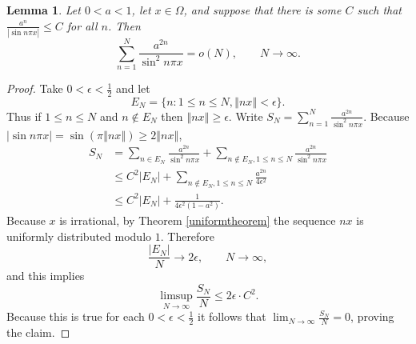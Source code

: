 \documentclass{amsart}
\newcommand{\norm}[1]{\left\Vert #1 \right\Vert}
\newtheorem{lemma}[theorem]{Lemma}
\begin{document}
\begin{lemma}
Let $0<a<1$, let $x \in \Omega$, and suppose that there is some $C$ such that
$\frac{a^n}{|\sin n\pi x|} \leq C$ for all $n$. Then
\[
\sum_{n=1}^N \frac{a^{2n}}{\sin^2 n \pi x} = o(N),\qquad N \to \infty.
\]
\label{axC}
\end{lemma}
\begin{proof}
Take $0<\epsilon<\frac{1}{2}$ and let
\[
E_N = \{n: 1 \leq n \leq N, \norm{nx}<\epsilon\}.
\]
Thus if $1 \leq n \leq N$ and $n \not \in E_N$ then $\norm{nx} \geq \epsilon$. 
Write $S_N=\sum_{n=1}^N \frac{a^{2n}}{\sin^2 n \pi x}$.
Because $|\sin n\pi x| =\sin(\pi \norm{nx}) \geq 2\norm{nx}$,
\begin{align*}
S_N&=\sum_{n \in E_N} \frac{a^{2n}}{\sin^2 n\pi x} + \sum_{n \not \in E_N, 1 \leq n \leq N} 
\frac{a^{2n}}{\sin^2 n \pi x}\\
&\leq C^2 |E_N| + \sum_{n \not \in E_N, 1 \leq n \leq N} \frac{a^{2n}}{4 \epsilon^2}\\
&\leq C^2 |E_N| + \frac{1}{4\epsilon^2(1-a^2)}. 
\end{align*}
Because $x$ is irrational, by Theorem \ref{uniformtheorem} the sequence $nx$ is uniformly distributed modulo $1$.
Therefore
\[
\frac{|E_N|}{N} \to 2\epsilon,\qquad N \to \infty,
\] 
and this implies
\[
\limsup_{N \to \infty} \frac{S_N}{N} \leq 2\epsilon \cdot C^2.
\]
Because this is true for each $0<\epsilon<\frac{1}{2}$ it follows that $\lim_{N \to \infty} \frac{S_N}{N} = 0$, proving the claim.
\end{proof}
\end{document}
